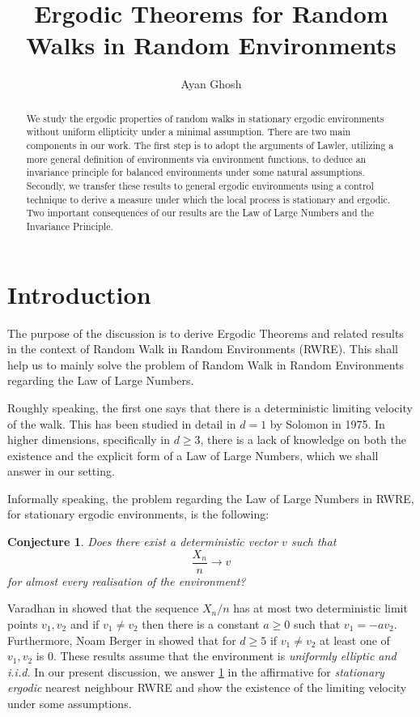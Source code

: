 \documentclass[final]{aomart}
\title{Ergodic Theorems for Random Walks in Random Environments}
\author{Ayan Ghosh}
\theoremstyle{plain}
\newtheorem{conjecture}[theorem]{Conjecture}
\theoremstyle{definition}
\theoremstyle{remark}
\begin{document}
\begin{abstract}
We study the ergodic properties of random walks in stationary ergodic environments without uniform ellipticity under a minimal assumption. There are two main components in our work. The first step is to adopt the arguments of Lawler, utilizing a more general definition of environments via environment functions, to deduce an invariance principle for balanced environments under some natural assumptions. Secondly, we transfer these results to general ergodic environments using a control technique to derive a measure under which the local process is stationary and ergodic. Two important consequences of our results are the Law of Large Numbers and the Invariance Principle.
\end{abstract}
\maketitle
\pagestyle{plain}
\section{Introduction}
The purpose of the discussion is to derive Ergodic Theorems and related results in the context of Random Walk in Random Environments (RWRE). This shall help us to mainly solve the problem of Random Walk in Random Environments regarding the Law of Large Numbers.

Roughly speaking, the first one says that there is a deterministic limiting velocity of the walk. This has been studied in detail in  $d=1$ by Solomon\cite{solomon} in 1975. In higher dimensions, specifically in $d\geq3$, there is a lack of knowledge on both the existence and the explicit form of a Law of Large Numbers, which we shall answer in our setting.

Informally speaking, the problem regarding the Law of Large Numbers in RWRE, for stationary ergodic environments, is the following:
\begin{conjecture}\label{thm:LLN}
Does there exist a deterministic vector $v$ such that \[
\frac{X_n}{n} \to v
\]  for almost every realisation of the environment? 
\end{conjecture} 

Varadhan in \cite{v} showed that the sequence $X_n/n$ has at most two deterministic limit points $v_1,v_2$ and if $v_1 \neq v_2$ then there is a constant $a\geq0$ such that $v_1 = -av_2$. Furthermore, Noam Berger in \cite{ber} showed that for $d\geq5$ if $v_1 \neq v_2$ at least one of $v_1,v_2$ is $0$. These results assume that the environment is \textit{uniformly elliptic and i.i.d.} In our present discussion, we answer \ref{thm:LLN} in the affirmative for \textit{stationary ergodic} nearest neighbour RWRE and show the existence of the limiting velocity under some assumptions.    
\end{document}
